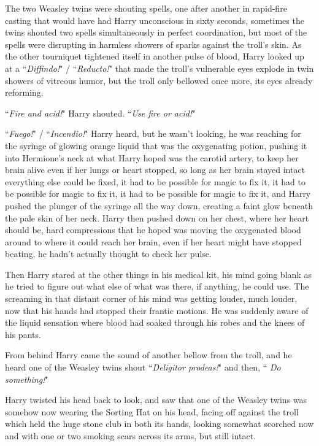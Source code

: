 The two Weasley twins were shouting spells, one after another in rapid-fire casting that would have had Harry unconscious in sixty seconds, sometimes the twins shouted two spells simultaneously in perfect coordination, but most of the spells were disrupting in harmless showers of sparks against the troll's skin. As the other tourniquet tightened itself in another pulse of blood, Harry looked up at a ``\emph{Diffindo!}" / ``\emph{Reducto!}" that made the troll's vulnerable eyes explode in twin showers of vitreous humor, but the troll only bellowed once more, its eyes already reforming.

``\emph{Fire and acid!}" Harry shouted. ``\emph{Use fire or acid!}"

``\emph{Fuego!}" / ``\emph{Incendio!}" Harry heard, but he wasn't looking, he was reaching for the syringe of glowing orange liquid that was the oxygenating potion, pushing it into Hermione's neck at what Harry hoped was the carotid artery, to keep her brain alive even if her lungs or heart stopped, so long as her brain stayed intact everything else could be fixed, it had to be possible for magic to fix it, it had to be possible for magic to fix it, it had to be possible for magic to fix it, and Harry pushed the plunger of the syringe all the way down, creating a faint glow beneath the pale skin of her neck. Harry then pushed down on her chest, where her heart should be, hard compressions that he hoped was moving the oxygenated blood around to where it could reach her brain, even if her heart might have stopped beating, he hadn't actually thought to check her pulse.

Then Harry stared at the other things in his medical kit, his mind going blank as he tried to figure out what else of what was there, if anything, he could use. The screaming in that distant corner of his mind was getting louder, much louder, now that his hands had stopped their frantic motions. He was suddenly aware of the liquid sensation where blood had soaked through his robes and the knees of his pants.

From behind Harry came the sound of another bellow from the troll, and he heard one of the Weasley twins shout ``\emph{Deligitor prodeas!}" and then, ``\emph{ Do something!}"

Harry twisted his head back to look, and saw that one of the Weasley twins was somehow now wearing the Sorting Hat on his head, facing off against the troll which held the huge stone club in both its hands, looking somewhat scorched now and with one or two smoking scars across its arms, but still intact.

